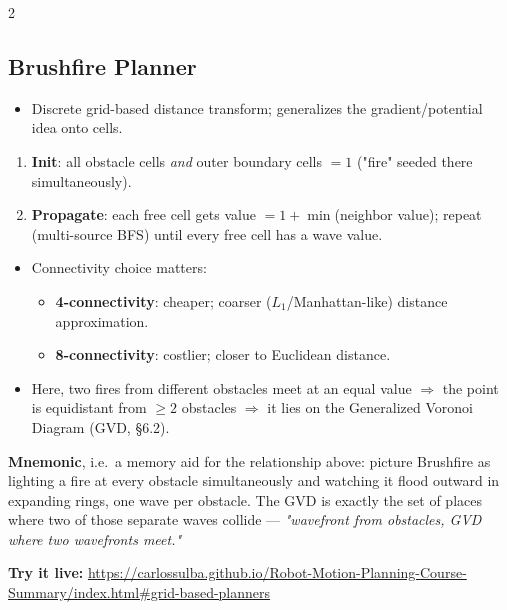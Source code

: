 \documentclass[10pt,a4paper]{article}
\newcommand{\keyterm}[1]{\textbf{#1}}
\newcommand{\demo}[1]{\textbf{Try it live:} \url{#1}}
\begin{document}
\begin{multicols}{2}
\subsection{Brushfire Planner}
\begin{itemize}
\item Discrete grid-based distance transform; generalizes the gradient/potential idea onto cells.
\end{itemize}
\begin{enumerate}
\item \keyterm{Init}: all obstacle cells \emph{and} outer boundary cells $=1$ ("fire" seeded there simultaneously).
\item \keyterm{Propagate}: each free cell gets value $=1+\min$(neighbor value); repeat (multi-source BFS) until every free cell has a wave value.
\end{enumerate}
\begin{itemize}
\item Connectivity choice matters:
  \begin{itemize}
  \item \keyterm{4-connectivity}: cheaper; coarser ($L_1$/Manhattan-like) distance approximation.
  \item \keyterm{8-connectivity}: costlier; closer to Euclidean distance.
  \end{itemize}
\item Here, two fires from different obstacles meet at an equal value $\Rightarrow$ the point is equidistant from $\ge2$ obstacles $\Rightarrow$ it lies on the Generalized Voronoi Diagram (GVD, \S6.2).
\end{itemize}
\begin{notebox}
\keyterm{Mnemonic}, i.e.\ a memory aid for the relationship above: picture Brushfire as lighting a fire at every obstacle simultaneously and watching it flood outward in expanding rings, one wave per obstacle. The GVD is exactly the set of places where two of those separate waves collide --- \emph{"wavefront from obstacles, GVD where two wavefronts meet."}
\end{notebox}
\begin{democallout}
\demo{https://carlossulba.github.io/Robot-Motion-Planning-Course-Summary/index.html\#grid-based-planners}
\end{democallout}


\end{multicols}
\end{document}
